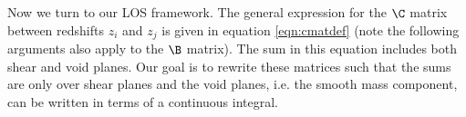 Now we turn to our LOS framework. The general expression for the $\C$ matrix between redshifts $z_i$ and $z_j$ is given in equation \ref{eqn:cmatdef} (note the following arguments also apply to the $\B$ matrix). The sum in this equation includes both shear and void planes. Our goal is to rewrite these matrices such that the sums are only over shear planes and the void planes, i.e. the smooth mass component, can be written in terms of a continuous integral.  